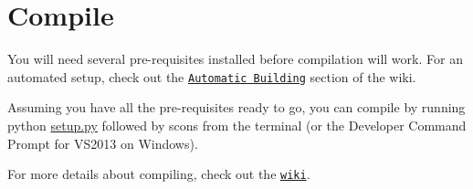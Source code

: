 \section*{Compile}

You will need several pre-\/requisites installed before compilation will work. For an automated setup, check out the \href{https://github.com/jarrettchisholm/glr/wiki/Automatic-Building}{\tt Automatic Building} section of the wiki.

Assuming you have all the pre-\/requisites ready to go, you can compile by running {\ttfamily python \hyperlink{setup_8py}{setup.\-py}} followed by {\ttfamily scons} from the terminal (or the Developer Command Prompt for V\-S2013 on Windows).

For more details about compiling, check out the \href{https://github.com/jarrettchisholm/glr/wiki}{\tt wiki}. 